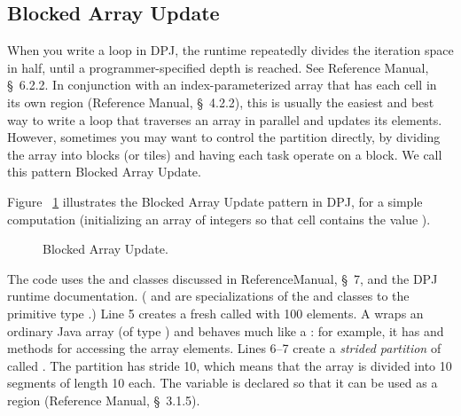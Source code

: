 \subsection{Blocked Array Update%
\label{sec:array:blocked}}

When you write a  loop in DPJ, the runtime repeatedly
divides the iteration space in half, until a programmer-specified
depth is reached.  See Reference Manual, \S~6.2.2.  In conjunction
with an index-parameterized array that has each cell in its own region
(Reference Manual, \S~4.2.2), this is usually the easiest and best way
to write a loop that traverses an array in parallel and updates its
elements.  However, sometimes you may want to control the partition
directly, by dividing the array into blocks (or tiles) and having each
task operate on a block.  We call this pattern Blocked Array Update.


 Figure ~\ref{fig:array:blocked}
illustrates the Blocked Array Update pattern in DPJ, for a simple
computation (initializing an array of integers so that cell 
contains the value ).

\begin{figure}

\caption{Blocked Array Update.}
\label{fig:array:blocked}
\end{figure}

The code uses the  and  classes
discussed in ReferenceManual, \S~7, and the DPJ runtime documentation.
( and  are specializations of
the  and  classes to the primitive
type .)  Line 5 creates a fresh  called
 with 100 elements.  A  wraps an ordinary
Java array (of type ) and behaves much like a
: for example, it has  and 
methods for accessing the array elements.  Lines 6--7 create a
\emph{strided partition} of  called .  The
partition has stride 10, which means that the array is divided into 10
segments of length 10 each.  The variable  is declared
 so that it can be used as a region (Reference Manual,
\S~3.1.5).

